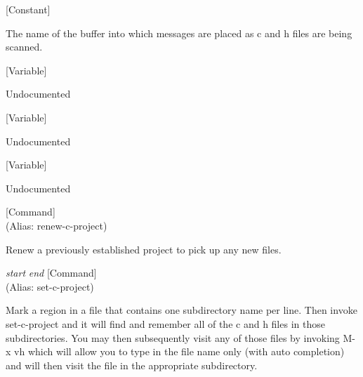 \vspace{1em}
\noindent
{}
\usebox{\funcname}
 \hfill [Constant]

\begin{doc-string}
The name of the buffer into which messages are placed as c and h files
are being scanned.
\end{doc-string}

\vspace{1em}
\noindent
{}
\usebox{\funcname}
 \hfill [Variable]

\begin{doc-string}
Undocumented
\end{doc-string}

\vspace{1em}
\noindent
{}
\usebox{\funcname}
 \hfill [Variable]

\begin{doc-string}
Undocumented
\end{doc-string}

\vspace{1em}
\noindent
{}
\usebox{\funcname}
 \hfill [Variable]

\begin{doc-string}
Undocumented
\end{doc-string}

\vspace{1em}
\noindent
{}
\usebox{\funcname}
 \hfill [Command]\\%
 (Alias: renew-c-project)

\begin{doc-string}
Renew a previously established project to pick up any new files.
\end{doc-string}

\vspace{1em}
\noindent
{}
\usebox{\funcname}\emph{start} \emph{end}
 \hfill [Command]\\%
 (Alias: set-c-project)

\begin{doc-string}
Mark a region in a file that contains one subdirectory name per line.
Then invoke set-c-project and it will find and remember all of the c and h
files in those subdirectories.  You may then subsequently visit any of
those files by invoking M-x vh which will allow you to type in the file
name only (with auto completion) and will then visit the file in the
appropriate subdirectory.
\end{doc-string}

